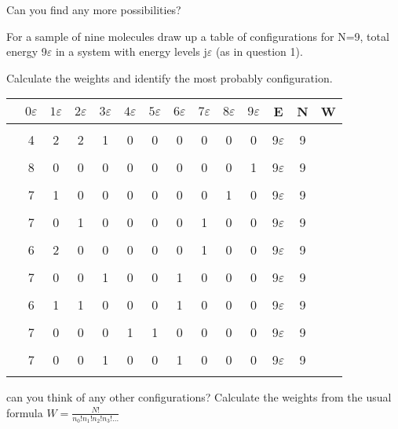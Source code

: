 \documentclass[addpoints,12pt]{exam}
\begin{document}
\begin{questions}
\begin{solution}
Can you find any more possibilities?
\end{solution}

\question For a sample of nine molecules draw up a table of configurations for N=9, total energy 9\(\varepsilon\) in a system with energy levels j\(\varepsilon\) (as in question 1).

Calculate the weights and identify the most probably configuration.

\begin{solution}

\begin{tabular}{lccccccccccccc}
& \(0\varepsilon\) & \(1\varepsilon\) & \(2\varepsilon\) & \(3\varepsilon\) & \(4\varepsilon\) & \(5\varepsilon\) & \(6\varepsilon\) & \(7\varepsilon\) & \(8\varepsilon\) & \(9\varepsilon\) & E & N & W\\\hline\\[-1em]
& 4 & 2 & 2 & 1 & 0 & 0 & 0 & 0 & 0 & 0 & 9\(\varepsilon\) & 9 \\\\[-1em]
& 8 & 0 & 0 & 0 & 0 & 0 & 0 & 0 & 0 & 1 & 9\(\varepsilon\) & 9 \\\\[-1em]
& 7 & 1 & 0 & 0 & 0 & 0 & 0 & 0 & 1 & 0 & 9\(\varepsilon\) & 9 \\\\[-1em]
& 7 & 0 & 1 & 0 & 0 & 0 & 0 & 1 & 0 & 0 & 9\(\varepsilon\) & 9 \\\\[-1em]
& 6 & 2 & 0 & 0 & 0 & 0 & 0 & 1 & 0 & 0 & 9\(\varepsilon\) & 9 \\\\[-1em]
& 7 & 0 & 0 & 1 & 0 & 0 & 1 & 0 & 0 & 0 & 9\(\varepsilon\) & 9 \\\\[-1em]
& 6 & 1 & 1 & 0 & 0 & 0 & 1 & 0 & 0 & 0 & 9\(\varepsilon\) & 9 \\\\[-1em]
& 7 & 0 & 0 & 0 & 1 & 1 & 0 & 0 & 0 & 0 & 9\(\varepsilon\) & 9 \\\\[-1em]
& 7 & 0 & 0 & 1 & 0 & 0 & 1 & 0 & 0 & 0 & 9\(\varepsilon\) & 9 \\\\[-1em]
\hline
\end{tabular}

can you think of any other configurations? Calculate the weights from the usual formula \(W=\frac{N!}{n_0!n_1!n_2!n_3! ...}\)

\end{solution}


\end{questions}
\end{document}
